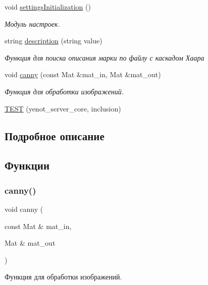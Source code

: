 \begin{DoxyCompactItemize}
void \mbox{\hyperlink{group__corecpp_ga242d25c7a9a1b7212bb890023c8131f5}{settings\+Initialization}} ()
\begin{DoxyCompactList}\small\item\em Модуль настроек. \end{DoxyCompactList}\item 
string \mbox{\hyperlink{group__corecpp_gaa85ae460901348b74381239ce0517d5f}{description}} (string value)
\begin{DoxyCompactList}\small\item\em Функция для поиска описания марки по файлу с каскадом Хаара \end{DoxyCompactList}\item 
void \mbox{\hyperlink{group__corecpp_gafe1c5d9570a4ccddf9b5105997e3ddb4}{canny}} (const Mat \&mat\+\_\+in, Mat \&mat\+\_\+out)
\begin{DoxyCompactList}\small\item\em Функция для обработки изображений. \end{DoxyCompactList}\item 
\mbox{\hyperlink{group__corecpp_ga62ce880c53a3fc77fad8f0bfb8711fd9}{T\+E\+ST}} (yenot\+\_\+server\+\_\+core, inclusion)
\end{DoxyCompactItemize}


\subsection{Подробное описание}


\subsection{Функции}
\mbox{\label{group__corecpp_gafe1c5d9570a4ccddf9b5105997e3ddb4}} 
\subsubsection{\texorpdfstring{canny()}{canny()}}
{\footnotesize\ttfamily void canny (\begin{DoxyParamCaption}\item[{const Mat \&}]{mat\+\_\+in,  }\item[{Mat \&}]{mat\+\_\+out }\end{DoxyParamCaption})}



Функция для обработки изображений. 

